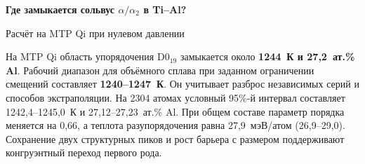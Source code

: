 \documentclass[11pt,a4paper]{article}
\begin{document}
\thispagestyle{plain}
{\sffamily\bfseries\fontsize{23}{26}\selectfont\color{ink}Где замыкается сольвус \(\alpha/\alpha_2\) в Ti--Al?\par}
{\large\sffamily\color{muted}Расчёт на MTP Qi при нулевом давлении\par}
\vspace{1mm}{\color{teal}\rule{\linewidth}{1.1pt}}
На MTP Qi область упорядочения D0$_{19}$ замыкается около \textbf{1244~К и 27,2~ат.\% Al}. Рабочий диапазон для объёмного сплава при заданном ограничении смещений составляет \textbf{1240--1247~К}. Он учитывает разброс независимых серий и способов экстраполяции. На 2304 атомах условный 95\%-й интервал составляет 1242,4--1245,0~К и 27,12--27,23~ат.\% Al. При общем составе параметр порядка меняется на 0,66, а теплота разупорядочения равна 27,9~мэВ/атом (26,9--29,0). Сохранение двух структурных пиков и рост барьера с размером поддерживают конгруэнтный переход первого рода.
\end{document}
